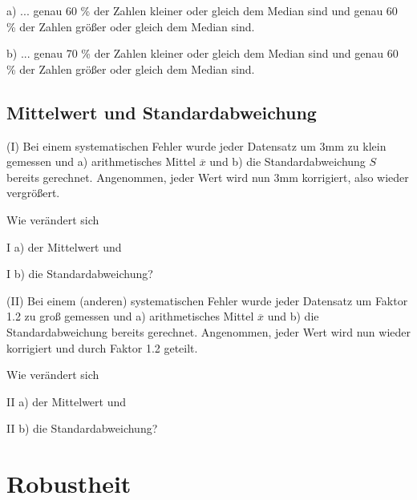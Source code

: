 a) ... genau 60 \% der Zahlen kleiner oder gleich dem Median sind und genau 60 \% der Zahlen größer oder gleich dem Median sind.

b) ... genau 70 \% der Zahlen kleiner oder gleich dem Median sind und genau 60 \% der Zahlen größer oder gleich dem Median sind.



\subsection{Mittelwert und Standardabweichung}
(I) Bei einem systematischen Fehler wurde jeder Datensatz um 3mm zu klein
gemessen und a) arithmetisches Mittel $\overline{x}$ und b) die
Standardabweichung $S$ bereits gerechnet. Angenommen, jeder Wert wird nun 3mm korrigiert,
also wieder vergrößert.

Wie verändert sich

I a) der Mittelwert und

I b) die Standardabweichung?

(II) Bei einem (anderen) systematischen Fehler wurde jeder Datensatz um
Faktor 1.2 zu groß
gemessen und a) arithmetisches Mittel $\overline{x} $ und b) die Standardabweichung
bereits gerechnet. Angenommen, jeder Wert wird nun wieder korrigiert
und durch Faktor 1.2 geteilt.

Wie verändert sich

II a) der Mittelwert und

II b) die Standardabweichung?



\section{Robustheit}


